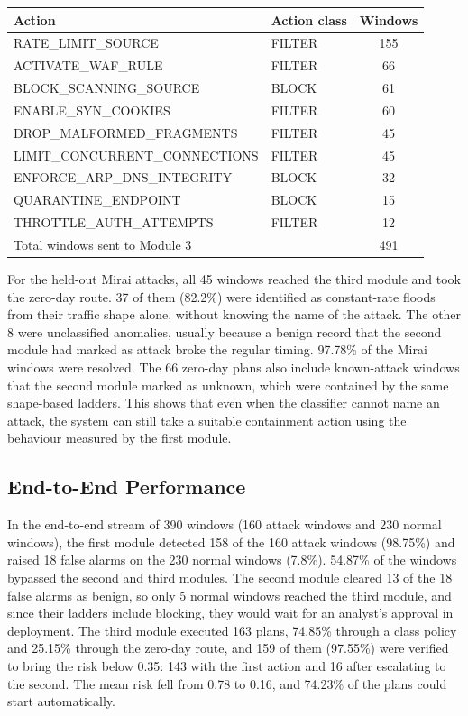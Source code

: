 \documentclass[]{interact}
\theoremstyle{plain}%
\theoremstyle{definition}
\theoremstyle{remark}
\begin{document}
\begin{table}[htbp]
{\begin{tabular}{llc}
\toprule
Action & Action class & Windows \\
\midrule
RATE\_LIMIT\_SOURCE            & FILTER & 155 \\
ACTIVATE\_WAF\_RULE            & FILTER & 66 \\
BLOCK\_SCANNING\_SOURCE        & BLOCK  & 61 \\
ENABLE\_SYN\_COOKIES           & FILTER & 60 \\
DROP\_MALFORMED\_FRAGMENTS     & FILTER & 45 \\
LIMIT\_CONCURRENT\_CONNECTIONS & FILTER & 45 \\
ENFORCE\_ARP\_DNS\_INTEGRITY   & BLOCK  & 32 \\
QUARANTINE\_ENDPOINT           & BLOCK  & 15 \\
THROTTLE\_AUTH\_ATTEMPTS       & FILTER & 12 \\
\midrule
Total windows sent to Module 3 & & 491 \\
\bottomrule
\end{tabular}}
\label{tab:actions}
\end{table}

For the held-out Mirai attacks, all 45 windows reached the third module and took the zero-day route. 37 of them (82.2\%) were identified as constant-rate floods from their traffic shape alone, without knowing the name of the attack. The other 8 were unclassified anomalies, usually because a benign record that the second module had marked as attack broke the regular timing. 97.78\% of the Mirai windows were resolved. The 66 zero-day plans also include known-attack windows that the second module marked as unknown, which were contained by the same shape-based ladders. This shows that even when the classifier cannot name an attack, the system can still take a suitable containment action using the behaviour measured by the first module.

\subsection{End-to-End Performance}
In the end-to-end stream of 390 windows (160 attack windows and 230 normal windows), the first module detected 158 of the 160 attack windows (98.75\%) and raised 18 false alarms on the 230 normal windows (7.8\%). 54.87\% of the windows bypassed the second and third modules. The second module cleared 13 of the 18 false alarms as benign, so only 5 normal windows reached the third module, and since their ladders include blocking, they would wait for an analyst's approval in deployment. The third module executed 163 plans, 74.85\% through a class policy and 25.15\% through the zero-day route, and 159 of them (97.55\%) were verified to bring the risk below 0.35: 143 with the first action and 16 after escalating to the second. The mean risk fell from 0.78 to 0.16, and 74.23\% of the plans could start automatically.
\end{document}
